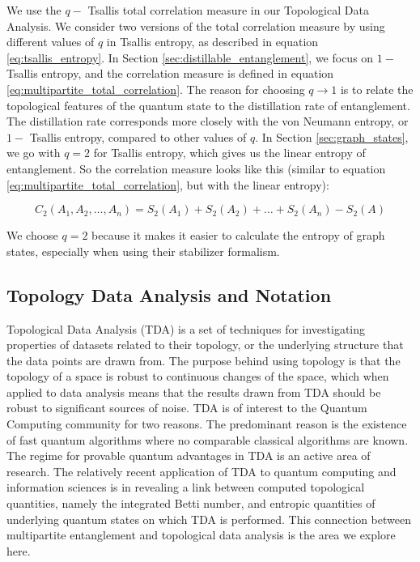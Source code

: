 \documentclass{article}
\begin{document}
We use the $q-$ Tsallis total correlation measure in our Topological Data Analysis. We consider two versions of the total correlation measure by using different values of $q$ in Tsallis entropy, as described in equation \ref{eq:tsallis_entropy}. In Section \ref{sec:distillable_entanglement}, we focus on $1 - $ Tsallis entropy, and the correlation measure is defined in equation \ref{eq:multipartite_total_correlation}. The reason for choosing $q \to 1$ is to relate the topological features of the quantum state to the distillation rate of entanglement. The distillation rate corresponds more closely with the von Neumann entropy, or $1 -$ Tsallis entropy, compared to other values of $q$. In Section \ref{sec:graph_states}, we go with $ q = 2 $ for Tsallis entropy, which gives us the linear entropy of entanglement. So the correlation measure looks like this (similar to equation \ref{eq:multipartite_total_correlation}, but with the linear entropy):

\begin{equation}
 \label{eq:multipartite_2-deformed_total_correlation}
C_2(A_1, A_2, \dots, A_n) = S_2(A_1) + S_2(A_2) + \dots + S_2(A_n) - S_2(A)
\end{equation}

We choose $ q = 2 $ because it makes it easier to calculate the entropy of graph states, especially when using their stabilizer formalism.



\subsection{Topology Data Analysis and Notation}
\label{subsec:topology}

Topological Data Analysis (TDA) is a set of techniques for investigating properties of datasets related to their topology, or the underlying structure that the data points are drawn from. The purpose behind using topology is that the topology of a space is robust to continuous changes of the space, which when applied to data analysis means that the results drawn from TDA should be robust to significant sources of noise. TDA is of interest to the Quantum Computing community for two reasons. The predominant reason is the existence of fast quantum algorithms where no comparable classical algorithms are known. The regime for provable quantum advantages in TDA is an active area of research. The relatively recent application of TDA to quantum computing and information sciences is in revealing a link between computed topological quantities, namely the integrated Betti number, and entropic quantities of underlying quantum states on which TDA is performed. This connection between multipartite entanglement and topological data analysis is the area we explore here. 
\end{document}
